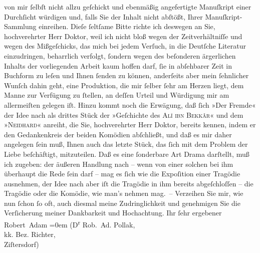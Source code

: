 \begin{ledgroupsized}[t]{13cm}
               von mir ſelbſt nicht allzu geſchickt und ebenmäßig angefertigte Manuſkript einer
               Durchſicht würdigen und, falls Sie der Inhalt nicht abſtößt, Ihrer
               Manuſkript-Sammlung einreihen.\pend
           \pstart
           Dieſe ſeltſame Bitte richte ich deswe{\pb}gen an Sie,
               hochverehrter Herr Doktor, weil ich nicht bloß wegen der Zeitverhältniſſe und wegen
               des Mißgeſchicks, das mich bei jedem Verſuch, in die Deutſche Literatur einzudringen,
               beharrlich verfolgt, ſondern wegen des beſonderen ärgerlichen Inhalts der
               vorliegenden Arbeit kaum hoffen darf, ſie in abſehbarer Zeit in Buchform zu leſen und
               Ihnen ſenden zu können, anderſeits aber mein ſehnlicher Wunſch dahin geht, eine
               Produktion, die mir ſelber ſehr am Herzen liegt, dem Manne zur Verfügung zu ſtellen,
               an deſſen Urteil und Würdigung mir am allermeiſten gelegen iſt.\pend
           \pstart
           Hinzu kommt noch die Erwägung, daß ſich »Der
                  Fremde« der Idee nach als drittes Stück der »Geſchichte des \textsc{Alî ibn Bekkâr}« und dem »\textsc{Neidhard}« anreiht, die Sie, hochverehrter Herr Doktor, bereits kennen, indem er den
               Gedankenkreis der beiden Komödien abſchließt, und daß es mir daher angelegen ſein
               muß, Ihnen auch das letzte Stück, das ſich mit {\pb}dem
               Problem der Liebe beſchäftigt, mitzuteilen. Daß es eine ſonderbare Art Drama
               darſtellt, muß ich zugeben: der äußeren Handlung nach – wenn von einer solchen bei
               ihm überhaupt die Rede ſein darf – mag es ſich wie die Expoſition einer Tragödie
               ausnehmen, der Idee nach aber iſt die Tragödie in ihm bereits abgeſchloſſen – die
               Tragödie oder die Komödie, wie man’s nehmen mag. –\pend
           \pstart
           Verzeihen Sie mir, wie nun ſchon ſo oft, auch diesmal meine Zudringlichkeit und
               genehmigen Sie die Verſicherung meiner Dankbarkeit und Hochachtung.\pend
           \pstart
           Ihr ſehr ergebener{\\[\baselineskip]}\spacefill\mbox{Robert Adam}\pend
           \leftskip=0em{}\pstart
           \noindent{}\raggedleft{}(D\textsuperscript{r} Rob. Ad. Pollak,{\\}kk. Bez. Richter,{\\}Ziſtersdorf)\pend
           

\end{ledgroupsized}
